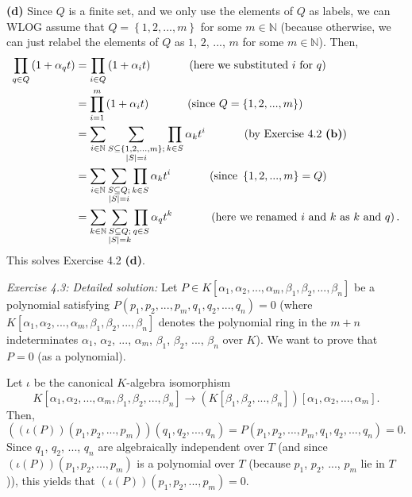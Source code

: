 \documentclass[numbers=enddot,12pt,final,onecolumn,notitlepage]{scrartcl}%
\begin{document}
\textbf{(d)} Since $Q$ is a finite set, and we only use the elements of $Q$ as
labels, we can WLOG assume that $Q=\left\{  1,2,...,m\right\}  $ for some
$m\in\mathbb{N}$ (because otherwise, we can just relabel the elements of $Q$
as $1$, $2$, $...$, $m$ for some $m\in\mathbb{N}$). Then,
\begin{align*}
\prod\limits_{q\in Q}\left(  1+\alpha_{q}t\right)   &  =\prod\limits_{i\in
Q}\left(  1+\alpha_{i}t\right)  \ \ \ \ \ \ \ \ \ \ \left(  \text{here we
substituted }i\text{ for }q\right) \\
&  =\prod\limits_{i=1}^{m}\left(  1+\alpha_{i}t\right)
\ \ \ \ \ \ \ \ \ \ \left(  \text{since }Q=\left\{  1,2,...,m\right\}  \right)
\\
&  =\sum\limits_{i\in\mathbb{N}}\sum\limits_{\substack{S\subseteq\left\{
1,2,...,m\right\}  ;\\\left\vert S\right\vert =i}}\prod\limits_{k\in S}%
\alpha_{k}t^{i}\ \ \ \ \ \ \ \ \ \ \left(  \text{by Exercise 4.2 \textbf{(b)}%
}\right) \\
&  =\sum\limits_{i\in\mathbb{N}}\sum\limits_{\substack{S\subseteq
Q;\\\left\vert S\right\vert =i}}\prod\limits_{k\in S}\alpha_{k}t^{i}%
\ \ \ \ \ \ \ \ \ \ \left(  \text{since }\left\{  1,2,...,m\right\}  =Q\right)
\\
&  =\sum\limits_{k\in\mathbb{N}}\sum\limits_{\substack{S\subseteq
Q;\\\left\vert S\right\vert =k}}\prod\limits_{q\in S}\alpha_{q}t^{k}%
\ \ \ \ \ \ \ \ \ \ \left(  \text{here we renamed }i\text{ and }k\text{ as
}k\text{ and }q\right)  .
\end{align*}
This solves Exercise 4.2 \textbf{(d)}.

\textit{Exercise 4.3: Detailed solution:} Let $P\in K\left[  \alpha_{1}%
,\alpha_{2},...,\alpha_{m},\beta_{1},\beta_{2},...,\beta_{n}\right]  $ be a
polynomial satisfying $P\left(  p_{1},p_{2},...,p_{m},q_{1},q_{2}%
,...,q_{n}\right)  =0$ (where $K\left[  \alpha_{1},\alpha_{2},...,\alpha
_{m},\beta_{1},\beta_{2},...,\beta_{n}\right]  $ denotes the polynomial ring
in the $m+n$ indeterminates $\alpha_{1}$, $\alpha_{2}$, $...$, $\alpha_{m}$,
$\beta_{1}$, $\beta_{2}$, $...$, $\beta_{n}$ over $K$). We want to prove that
$P=0$ (as a polynomial).

Let $\iota$ be the canonical $K$-algebra isomorphism%
\[
K\left[  \alpha_{1},\alpha_{2},...,\alpha_{m},\beta_{1},\beta_{2}%
,...,\beta_{n}\right]  \rightarrow\left(  K\left[  \beta_{1},\beta
_{2},...,\beta_{n}\right]  \right)  \left[  \alpha_{1},\alpha_{2}%
,...,\alpha_{m}\right]  .
\]
Then,%
\[
\left(  \left(  \iota\left(  P\right)  \right)  \left(  p_{1},p_{2}%
,...,p_{m}\right)  \right)  \left(  q_{1},q_{2},...,q_{n}\right)  =P\left(
p_{1},p_{2},...,p_{m},q_{1},q_{2},...,q_{n}\right)  =0.
\]
Since $q_{1}$, $q_{2}$, $...$, $q_{n}$ are algebraically independent over $T$
(and since $\left(  \iota\left(  P\right)  \right)  \left(  p_{1}%
,p_{2},...,p_{m}\right)  $ is a polynomial over $T$ (because $p_{1}$, $p_{2}$,
$...$, $p_{m}$ lie in $T$)), this yields that $\left(  \iota\left(  P\right)
\right)  \left(  p_{1},p_{2},...,p_{m}\right)  =0$.
\end{document}

